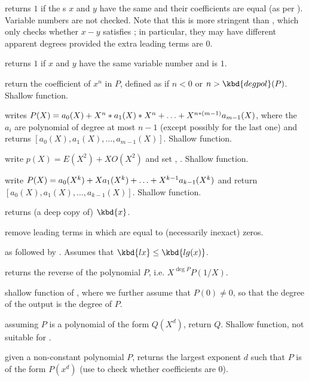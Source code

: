  returns $1$ if the s $x$ and $y$
have the same  and their coefficients are equal (as per
). Variable numbers are not checked. Note that this is more
stringent than , which only checks whether $x - y$ satisfies
; in particular, they may have different apparent degrees provided
the extra leading terms are $0$.

 returns $1$ if $x$ and $y$
have the same variable number and  is $1$.


 return the coefficient of $x^n$ in $P$,
defined as  if $n < 0$ or $n > \kbd{degpol}(P)$. Shallow
function.

 writes
$P(X)=a_0(X)+X^n*a_1(X)*X^n+\ldots+X^{n*(m-1)}\*a_{m-1}(X)$,
where the $a_i$ are polynomial of degree at most $n-1$
(except possibly for the last one) and returns
$[a_0(X),a_1(X),\ldots,a_{m-1}(X)]$.  Shallow function.

 write $p(X) = E(X^2) +
X O(X^2)$ and set , .  Shallow function.

 write
$P(X)=a_0(X^k)+X\*a_1(X^k)+\ldots+X^{k-1}\*a_{k-1}(X^k)$ and return
$[a_0(X),a_1(X),\ldots,a_{k-1}(X)]$.  Shallow function.

 returns (a deep copy of) $\kbd{x}$.

 remove leading terms in  which are
equal to (necessarily inexact) zeros.

 as 
followed by . Assumes that $\kbd{lx} \leq
\kbd{lg(x)}$.

 returns the reverse of the polynomial
$P$, i.e. $X^{\deg P} P(1/X)$.

 shallow function of ,
where we further assume that $P(0)\neq 0$, so that the degree of the output
is the degree of $P$.

 assuming $P$ is a polynomial of the
form $Q(X^d)$, return $Q$. Shallow function, not suitable for
.

 given a non-constant polynomial
$P$, returns the largest exponent $d$ such that $P$ is of the form $P(x^d)$
(use  to check whether coefficients are 0).

